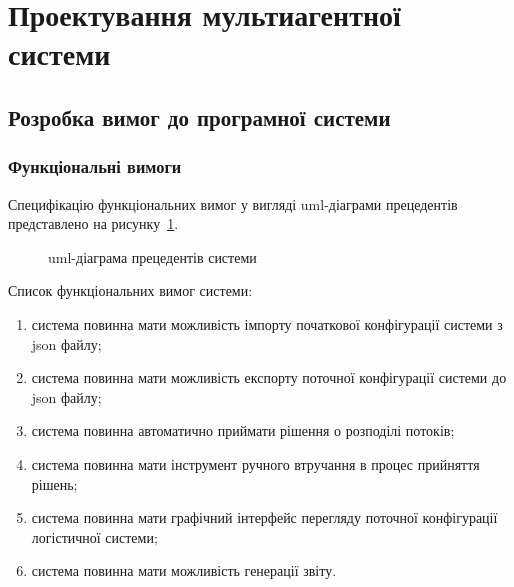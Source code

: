 \section{Проектування мультиагентної системи}
\subsection{Розробка вимог до програмної системи}
\subsubsection{Функціональні вимоги}
Специфікацію функціональних вимог у вигляді \acrshort{uml}-діаграми прецедентів представлено на рисунку~\ref{fig:system_usecase}.

\begin{figure}[H]
	\centering


	\caption{\acrshort{uml}-діаграма прецедентів системи}
	\label{fig:system_usecase}
\end{figure}

Список функціональних вимог системи:
\begin{enumerate}[label={\arabic*)}]
	\item система повинна мати можливість імпорту початкової конфігурації системи з \acrshort{json} файлу;
	\item система повинна мати можливість експорту поточної конфігурації системи до \acrshort{json} файлу;
	\item система повинна автоматично приймати рішення о розподілі потоків;
	\item система повинна мати інструмент ручного втручання в процес прийняття рішень;
	\item система повинна мати графічний інтерфейс перегляду поточної конфігурації логістичної системи;
	\item система повинна мати можливість генерації звіту.
\end{enumerate}

